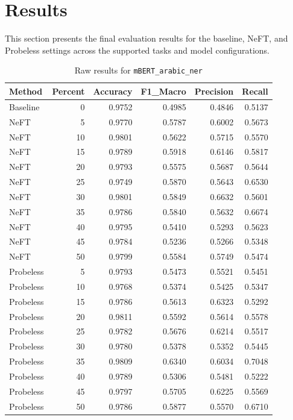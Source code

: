 \documentclass[12pt]{article}
\begin{document}
\section{Results}

This section presents the final evaluation results for the baseline, NeFT, and Probeless settings across the supported tasks and model configurations.

\begin{table}[H]
\centering
\caption{Raw results for \texttt{mBERT\_arabic\_ner}}
\label{tab:mbert-arabic-ner}
\begin{tabular}{lrrrrr}
\toprule
Method & Percent & Accuracy & F1\_Macro & Precision & Recall \\
\midrule
Baseline & 0 & 0.9752 & 0.4985 & 0.4846 & 0.5137 \\
NeFT & 5 & 0.9770 & 0.5787 & 0.6002 & 0.5673 \\
NeFT & 10 & 0.9801 & 0.5622 & 0.5715 & 0.5570 \\
NeFT & 15 & 0.9789 & 0.5918 & 0.6146 & 0.5817 \\
NeFT & 20 & 0.9793 & 0.5575 & 0.5687 & 0.5644 \\
NeFT & 25 & 0.9749 & 0.5870 & 0.5643 & 0.6530 \\
NeFT & 30 & 0.9801 & 0.5849 & 0.6632 & 0.5601 \\
NeFT & 35 & 0.9786 & 0.5840 & 0.5632 & 0.6674 \\
NeFT & 40 & 0.9795 & 0.5410 & 0.5293 & 0.5623 \\
NeFT & 45 & 0.9784 & 0.5236 & 0.5266 & 0.5348 \\
NeFT & 50 & 0.9799 & 0.5584 & 0.5749 & 0.5474 \\
Probeless & 5 & 0.9793 & 0.5473 & 0.5521 & 0.5451 \\
Probeless & 10 & 0.9768 & 0.5374 & 0.5425 & 0.5347 \\
Probeless & 15 & 0.9786 & 0.5613 & 0.6323 & 0.5292 \\
Probeless & 20 & 0.9811 & 0.5592 & 0.5614 & 0.5578 \\
Probeless & 25 & 0.9782 & 0.5676 & 0.6214 & 0.5517 \\
Probeless & 30 & 0.9780 & 0.5378 & 0.5352 & 0.5445 \\
Probeless & 35 & 0.9809 & 0.6340 & 0.6034 & 0.7048 \\
Probeless & 40 & 0.9789 & 0.5306 & 0.5481 & 0.5222 \\
Probeless & 45 & 0.9797 & 0.5705 & 0.6225 & 0.5569 \\
Probeless & 50 & 0.9786 & 0.5877 & 0.5570 & 0.6710 \\
\bottomrule
\end{tabular}
\end{table}
\end{document}
